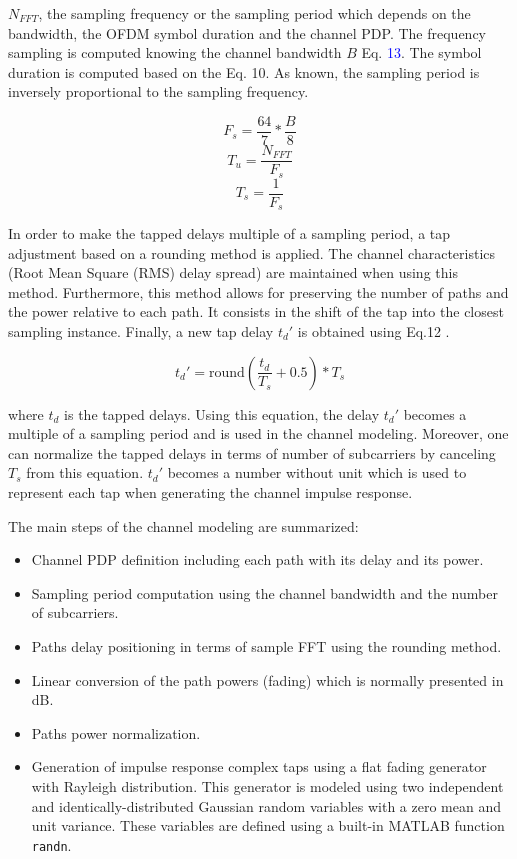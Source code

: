 \documentclass[10pt]{article}
\begin{document}
$N_{FFT}$, the sampling frequency or the sampling period which depends on the bandwidth, the OFDM symbol duration and the channel PDP. The frequency sampling is computed knowing the channel bandwidth $B$ Eq. \textcolor{blue}{ 13}\cite{31}. The symbol duration is computed based on the Eq. 10. As known, the sampling period is inversely proportional to the sampling frequency.

\begin{equation}
    F_s = \frac{64}{7} * \frac{B}{8}
\end{equation}
\begin{equation}
    T_u = \frac{N_{FFT}}{F_s}
\end{equation}
\begin{equation}
    T_s = \frac{1}{F_s}
\end{equation}

In order to make the tapped delays multiple of a sampling period, a tap adjustment based on a rounding method is applied. The channel characteristics (Root Mean Square (RMS) delay spread) are maintained when using this method. Furthermore, this method allows for preserving the number of paths and the power relative to each path. It consists in the shift of the tap into the closest sampling instance. Finally, a new tap delay $t_d'$ is obtained using Eq.12 \cite{30}.

\begin{equation}
    t_d' = \text{round}\left(\frac{t_d}{T_s} + 0.5\right) * T_s
\end{equation}

where $t_d$ is the tapped delays. Using this equation, the delay $t_d'$ becomes a multiple of a sampling period and is used in the channel modeling. Moreover, one can normalize the tapped delays in terms of number of subcarriers by canceling $T_s$ from this equation. $t_d'$ becomes a number without unit which is used to represent each tap when generating the channel impulse response.

The main steps of the channel modeling are summarized:
\begin{itemize}[label=-]
    \item Channel PDP definition including each path with its delay and its power.
     \item  Sampling period computation using the channel bandwidth and the number of subcarriers.
  \item  Paths delay positioning in terms of sample FFT using the rounding method.
   \item  Linear conversion of the path powers (fading) which is normally presented in dB.
   \item Paths power normalization.
    
    \item Generation of impulse response complex taps using a flat fading generator with Rayleigh distribution. This generator is modeled using two independent and identically-distributed Gaussian random variables with a zero mean and unit variance. These variables are defined using a built-in MATLAB function \texttt{randn}.
\end{itemize}
\end{document}
